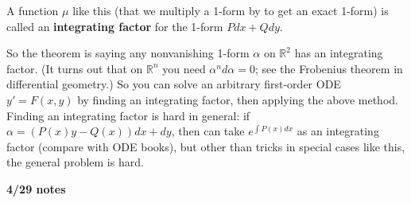 \begin{definition}

A function \(\mu\) like this (that we multiply a 1-form by to get an exact 1-form) is called an \textbf{integrating factor} for the 1-form \(Pdx + Qdy\).

\end{definition}

So the theorem is saying any nonvanishing 1-form \(\alpha\) on \(\mathbb{R}^2\) has an integrating factor. (It turns out that on \(\mathbb{R}^n\) you need \(\alpha^n d \alpha = 0\); see the Frobenius theorem in differential geometry.) So you can solve an arbitrary first-order ODE \(y' = F(x,y)\) by finding an integrating factor, then applying the above method. Finding an integrating factor is hard in general: if \(\alpha =(P(x)y  - Q(x)) dx + dy\), then can take \(e^{\int P(x) dx}\) as an integrating factor (compare with ODE books), but other than tricks in special cases like this, the general problem is hard.


\textbf{4/29 notes}

